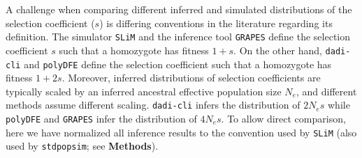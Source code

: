 \documentclass[hidelinks]{article}
\newcommand{\stdpopsim}{\texttt{stdpopsim}\xspace}
\newcommand{\slim}{\texttt{SLiM}\xspace}
\newcommand{\polydfe}{\texttt{polyDFE}\xspace}
\newcommand{\dadicli}{\texttt{dadi-cli}\xspace}
\newcommand{\grapes}{\texttt{GRAPES}\xspace}
\begin{document}
    A challenge when comparing different inferred and simulated distributions of the selection coefficient ($s$)
    is differing conventions in the literature regarding its definition.
    The simulator \slim and the inference tool \grapes define the selection coefficient $s$ such that a homozygote has fitness $1+s$.
    On the other hand, \dadicli and \polydfe define the selection coefficient such that a homozygote has fitness $1+2s$.
    Moreover, inferred distributions of selection coefficients are typically scaled by an inferred ancestral
    effective population size $N_e$, and different methods assume different scaling.
    \dadicli infers the distribution of $2 N_e s$ while \polydfe and \grapes infer the distribution of $4 N_e s$.
    To allow direct comparison, here we have normalized all inference results to the convention used by \slim
    (also used by \stdpopsim; see \textbf{Methods}).
\end{document}
